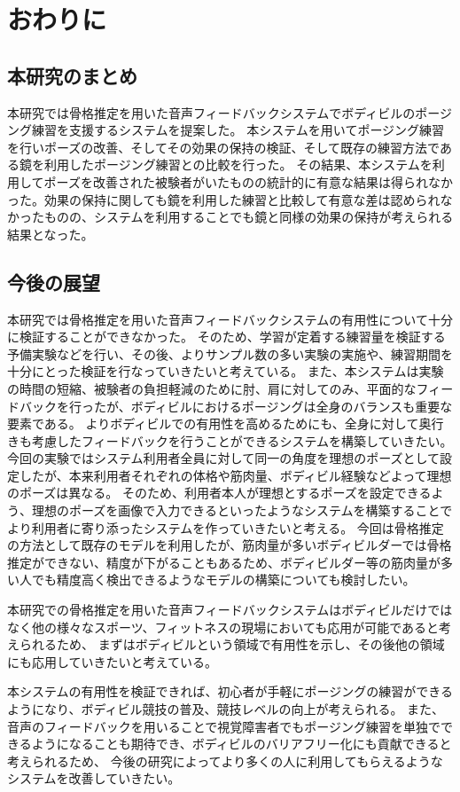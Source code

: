 \chapter{おわりに}
\label{conclusion}

\section{本研究のまとめ}
本研究では骨格推定を用いた音声フィードバックシステムでボディビルのポージング練習を支援するシステムを提案した。
本システムを用いてポージング練習を行いポーズの改善、そしてその効果の保持の検証、そして既存の練習方法である鏡を利用したポージング練習との比較を行った。
その結果、本システムを利用してポーズを改善された被験者がいたものの統計的に有意な結果は得られなかった。効果の保持に関しても鏡を利用した練習と比較して有意な差は認められなかったものの、システムを利用することでも鏡と同様の効果の保持が考えられる結果となった。

\section{今後の展望}

本研究では骨格推定を用いた音声フィードバックシステムの有用性について十分に検証することができなかった。
そのため、学習が定着する練習量を検証する予備実験などを行い、その後、よりサンプル数の多い実験の実施や、練習期間を十分にとった検証を行なっていきたいと考えている。
また、本システムは実験の時間の短縮、被験者の負担軽減のために肘、肩に対してのみ、平面的なフィードバックを行ったが、ボディビルにおけるポージングは全身のバランスも重要な要素である。
よりボディビルでの有用性を高めるためにも、全身に対して奥行きも考慮したフィードバックを行うことができるシステムを構築していきたい。
今回の実験ではシステム利用者全員に対して同一の角度を理想のポーズとして設定したが、本来利用者それぞれの体格や筋肉量、ボディビル経験などよって理想のポーズは異なる。
そのため、利用者本人が理想とするポーズを設定できるよう、理想のポーズを画像で入力できるといったようなシステムを構築することでより利用者に寄り添ったシステムを作っていきたいと考える。
今回は骨格推定の方法として既存のモデルを利用したが、筋肉量が多いボディビルダーでは骨格推定ができない、精度が下がることもあるため、ボディビルダー等の筋肉量が多い人でも精度高く検出できるようなモデルの構築についても検討したい。

本研究での骨格推定を用いた音声フィードバックシステムはボディビルだけではなく他の様々なスポーツ、フィットネスの現場においても応用が可能であると考えられるため、
まずはボディビルという領域で有用性を示し、その後他の領域にも応用していきたいと考えている。

本システムの有用性を検証できれば、初心者が手軽にポージングの練習ができるようになり、ボディビル競技の普及、競技レベルの向上が考えられる。
また、音声のフィードバックを用いることで視覚障害者でもポージング練習を単独でできるようになることも期待でき、ボディビルのバリアフリー化にも貢献できると考えられるため、
今後の研究によってより多くの人に利用してもらえるようなシステムを改善していきたい。
